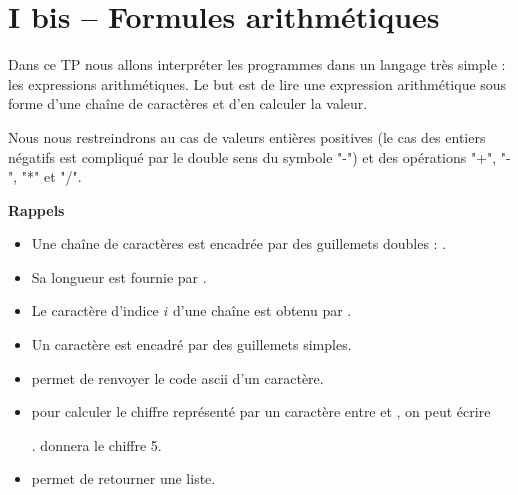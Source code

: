 \chapter{I bis -- Formules arithmétiques}
\thispagestyle{empty}
{\sf 
Dans ce TP nous allons interpréter les programmes dans un langage très simple : les expressions arithmétiques. Le but est de lire une expression arithmétique sous forme d'une chaîne de caractères et d'en calculer la valeur.

Nous nous restreindrons au cas de valeurs entières positives (le cas des entiers négatifs est compliqué par le double sens du symbole "-") et des opérations "+", "-", "*" et "/".}

{\bf Rappels}

\begin{itemize}
    \item Une chaîne de caractères est encadrée par des guillemets doubles : .
    \item Sa longueur est fournie par .
    \item Le caractère d'indice $i$ d'une chaîne est obtenu par .
    \item Un caractère est encadré par des guillemets simples.
    \item {} permet de renvoyer le code ascii d'un caractère.
    \item pour calculer le chiffre représenté par un caractère entre  et , on peut écrire 
    
    .  donnera le chiffre 5.
    \item {} permet de retourner une liste.
\end{itemize}
